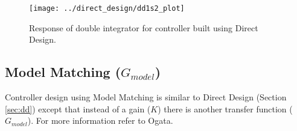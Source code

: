 \documentclass{article}
\begin{document}




\begin{figure}
\begin{center}
\texttt{[image: ../direct\_design/dd1s2\_plot]}
\end{center}
\caption{Response of double integrator for controller built
using Direct Design.}
\label{fig:dd1s2_plot}
\end{figure}


\clearpage
\subsection{Model Matching ($G_{model}$)}
\label{sec:mm}

Controller design using Model Matching is similar to Direct Design
(Section \ref{sec:dd}) except that instead of a gain ($K$) there is
another transfer function ($G_{model}$).
For more information refer to Ogata\autocite[Pg. 532]{ogata1995discrete}.
\end{document}
